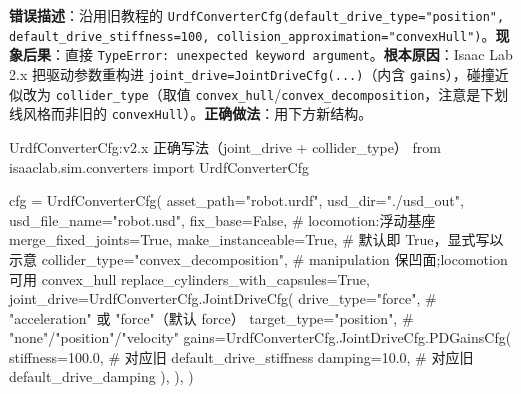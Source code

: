 \begin{pitfall}
\textbf{错误描述}：沿用旧教程的 \texttt{UrdfConverterCfg(default\_drive\_type="position", default\_drive\_stiffness=100, collision\_approximation="convexHull")}。\textbf{现象后果}：直接 \texttt{TypeError: unexpected keyword argument}。\textbf{根本原因}：Isaac Lab 2.x 把驱动参数重构进 \texttt{joint\_drive=JointDriveCfg(...)}（内含 \texttt{gains}），碰撞近似改为 \texttt{collider\_type}（取值 \texttt{convex\_hull}/\allowbreak\texttt{convex\_decomposition}，注意是下划线风格而非旧的 \texttt{convexHull}）。\textbf{正确做法}：用下方新结构。
\end{pitfall}

\begin{codebox}[Python]{UrdfConverterCfg:v2.x 正确写法（joint\_drive + collider\_type）}
from isaaclab.sim.converters import UrdfConverterCfg

cfg = UrdfConverterCfg(
    asset_path="robot.urdf",
    usd_dir="./usd_out",
    usd_file_name="robot.usd",
    fix_base=False,                         # locomotion:浮动基座
    merge_fixed_joints=True,
    make_instanceable=True,                 # 默认即 True，显式写以示意
    collider_type="convex_decomposition",   # manipulation 保凹面;locomotion 可用 convex_hull
    replace_cylinders_with_capsules=True,
    joint_drive=UrdfConverterCfg.JointDriveCfg(
        drive_type="force",                 # "acceleration" 或 "force"（默认 force）
        target_type="position",             # "none"/"position"/"velocity"
        gains=UrdfConverterCfg.JointDriveCfg.PDGainsCfg(
            stiffness=100.0,                # 对应旧 default_drive_stiffness
            damping=10.0,                   # 对应旧 default_drive_damping
        ),
    ),
)
\end{codebox}

